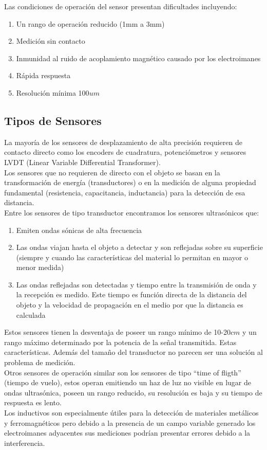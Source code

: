 Las condiciones de operación del sensor presentan dificultades incluyendo:
\begin{enumerate}
	\item Un rango de operación reducido (1mm a 3mm)
	\item Medición sin contacto 
	\item Inmunidad al ruido de acoplamiento magnético causado por los electroimanes
	\item Rápida respuesta
	\item Resolución mínima  100$um$

\end{enumerate}

\subsection{Tipos de Sensores}
La mayoría de los sensores de desplazamiento de alta precisión requieren de contacto directo como los encoders de cuadratura, potenciómetros y sensores LVDT (Linear Variable Differential Transformer).\\
Los sensores que no requieren de directo con el objeto se basan en la transformación de energía (transductores) o en la medición de alguna propiedad fundamental (resistencia, capacitancia, inductancia) para la detección de esa distancia.\\
Entre los sensores de tipo transductor encontramos los sensores ultrasónicos que:
\begin{enumerate}
	\item Emiten ondas sónicas de alta frecuencia
	\item Las ondas viajan hasta el objeto a detectar y son reflejadas sobre su superficie (siempre y cuando las características del material lo permitan en mayor o menor medida) 
	\item Las ondas reflejadas son detectadas y tiempo entre la transmisión de onda y la recepción es medido. Este tiempo es función directa de la distancia del objeto y la velocidad de propagación en el medio por que la distancia es calculada
\end{enumerate}

Estos sensores tienen la desventaja de poseer un rango mínimo de 10-20$cm$ y un rango máximo determinado por la potencia de la señal transmitida. Estas características. Además del tamaño del transductor no parecen ser una solución al problema de medición.\\
Otros sensores de operación similar son los sensores de tipo “time of fligth” (tiempo de vuelo), estos operan emitiendo un haz de luz no visible en lugar de ondas ultrasónica, poseen un rango reducido, su resolución es baja y su tiempo de respuesta es lento.\\
Los inductivos son especialmente útiles para la detección de materiales metálicos y ferromagnéticos pero debido a la presencia de un campo variable generado los electroimanes adyacentes sus mediciones podrían presentar errores debido a la interferencia.\\

